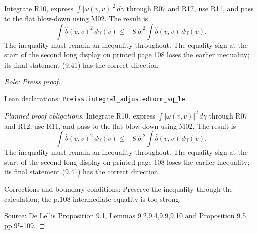 \begin{lemma}
\label{lem:rigidity-integral-quadratic-bound}






Integrate R10, express $\int|\omega(v,v)|^2\,d\gamma$ through R07 and R12,
use R11, and pass to the flat blow-down using M02. The result is
\[
 \int\widehat b(v,v)^2\,d\gamma(v)
 \leq-8|b|^2\int\widehat b(v,v)\,d\gamma(v).
\]
The inequality must remain an inequality throughout. The equality sign at
the start of the second long display on printed page 108 loses the earlier
inequality; its final statement (9.41) has the correct direction.
\par\emph{Role: Preiss proof.}
\par Lean declarations: \texttt{Preiss.integral\_adjustedForm\_sq\_le}.
\end{lemma}
\begin{proof}[Planned proof obligations]

Integrate R10, express $\int|\omega(v,v)|^2\,d\gamma$ through R07 and R12,
use R11, and pass to the flat blow-down using M02. The result is
\[
 \int\widehat b(v,v)^2\,d\gamma(v)
 \leq-8|b|^2\int\widehat b(v,v)\,d\gamma(v).
\]
The inequality must remain an inequality throughout. The equality sign at
the start of the second long display on printed page 108 loses the earlier
inequality; its final statement (9.41) has the correct direction.
\par Corrections and boundary conditions: Preserve the inequality through the calculation; the p.108 intermediate equality is too strong.
\par Source: De Lellis Proposition 9.1, Lemmas 9.2,9.4,9.9,9.10 and Proposition 9.5, pp.95-109.
\end{proof}

